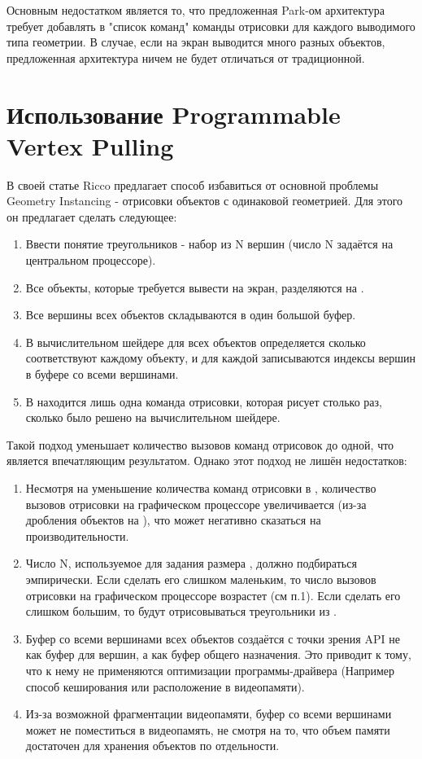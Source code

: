 	Основным недостатком является то, что предложенная Park-ом\cite{park2009fast} архитектура требует добавлять в "список команд" команды отрисовки для каждого выводимого типа геометрии. В случае, если на экран выводится много разных объектов, предложенная архитектура ничем не будет отличаться от традиционной.
	
\section{Использование Programmable Vertex Pulling}\label{ch2:Programmable-Vertex-Pulling} %
	В своей статье Ricco\cite{riccio2013introducing} предлагает способ избавиться от основной проблемы Geometry Instancing - отрисовки объектов с одинаковой геометрией. Для этого он предлагает сделать следующее:
	\begin{enumerate}[1.]
		\item Ввести понятие  треугольников - набор из N вершин (число N задаётся на центральном процессоре).
		\item Все объекты, которые требуется вывести на экран, разделяются на .
		\item Все вершины всех объектов складываются в один большой буфер.\label{vertex_big_buffer}
		\item В вычислительном шейдере для всех объектов определяется сколько  соответствуют каждому объекту, и для каждой  записываются индексы вершин в буфере со всеми вершинами. 
		\item В  находится лишь одна команда отрисовки, которая рисует  столько раз, сколько было решено на вычислительном шейдере.
	\end{enumerate}
	
	Такой подход уменьшает количество вызовов команд отрисовок до одной, что является впечатляющим результатом. Однако этот подход не лишён недостатков:
	\begin{enumerate}[1.]
		\item Несмотря на уменьшение количества команд отрисовки в , количество вызовов отрисовки на графическом процессоре увеличивается (из-за дробления объектов на ), что может негативно сказаться на производительности. 
		\item Число N, используемое для задания размера , должно подбираться эмпирически. Если сделать его слишком маленьким, то число вызовов отрисовки на графическом процессоре возрастет (см п.1). Если сделать его слишком большим, то будут отрисовываться  треугольники из .
		\item Буфер со всеми вершинами всех объектов создаётся с точки зрения API не как буфер для вершин, а как буфер общего назначения. Это приводит к тому, что к нему не применяются оптимизации программы-драйвера (Например способ кеширования или расположение в видеопамяти).
		\item Из-за возможной фрагментации видеопамяти, буфер со всеми вершинами может не поместиться в видеопамять, не смотря на то, что объем памяти достаточен для хранения объектов по отдельности.
	\end{enumerate}
		
